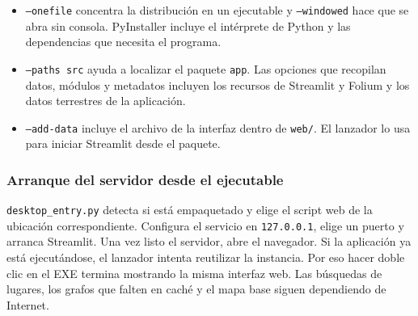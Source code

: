 \documentclass[11pt,a4paper]{article}
\begin{document}
\begin{itemize}
\item \texttt{--onefile} concentra la distribución en un ejecutable y \texttt{--windowed} hace que se abra sin consola. PyInstaller incluye el intérprete de Python y las dependencias que necesita el programa.
\item \texttt{--paths src} ayuda a localizar el paquete \texttt{app}. Las opciones que recopilan datos, módulos y metadatos incluyen los recursos de Streamlit y Folium y los datos terrestres de la aplicación.
\item \texttt{--add-data} incluye el archivo de la interfaz dentro de \texttt{web/}. El lanzador lo usa para iniciar Streamlit desde el paquete.
\end{itemize}

\subsubsection{Arranque del servidor desde el ejecutable}
\texttt{desktop\_entry.py} detecta si está empaquetado y elige el script web de la ubicación correspondiente. Configura el servicio en \texttt{127.0.0.1}, elige un puerto y arranca Streamlit. Una vez listo el servidor, abre el navegador. Si la aplicación ya está ejecutándose, el lanzador intenta reutilizar la instancia. Por eso hacer doble clic en el EXE termina mostrando la misma interfaz web. Las búsquedas de lugares, los grafos que falten en caché y el mapa base siguen dependiendo de Internet.
\end{document}
